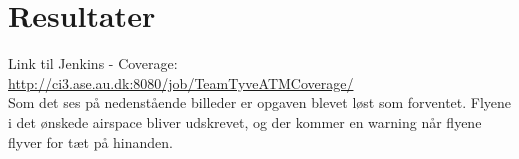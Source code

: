 \section{Resultater}
Link til Jenkins - Coverage: \url{http://ci3.ase.au.dk:8080/job/TeamTyveATMCoverage/} \\
Som det ses på nedenstående billeder er opgaven blevet løst som forventet. Flyene i det ønskede airspace bliver udskrevet, og der kommer en warning når flyene flyver for tæt på hinanden.




